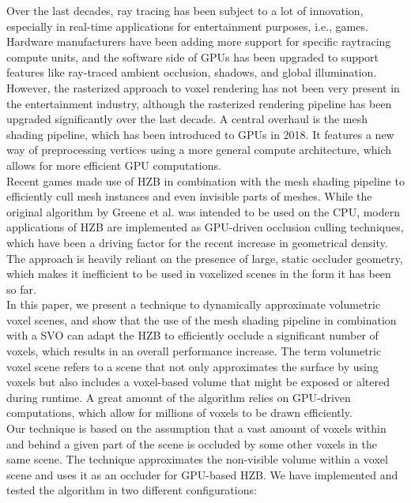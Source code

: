 \documentclass[conference]{IEEEtran}
\begin{document}
\noindent
Over the last decades, ray tracing has been subject to a lot of innovation, especially in  
real-time applications for entertainment purposes, i.e., games. Hardware manufacturers have 
been adding more support for specific raytracing compute units, and the software side of 
GPUs has been upgraded to support features like ray-traced ambient occlusion, shadows, 
and global illumination. However, the rasterized approach to voxel rendering  has not been 
very present in the entertainment industry, although the rasterized rendering pipeline has 
been upgraded significantly over the last decade. A central overhaul is the mesh shading 
pipeline, which has been introduced to \ac{GPU}s in 2018. It features a new way of preprocessing 
vertices using a more general compute architecture, which allows for more efficient \ac{GPU} 
computations. \\

\noindent
Recent games made use of \ac{HZB} in combination with the mesh shading pipeline to efficiently 
cull mesh instances and even invisible parts of meshes. While the original algorithm by Greene 
et al. \cite{b1} was intended to be used on the \ac{CPU}, modern applications of \ac{HZB} are implemented 
as \ac{GPU}-driven occlusion culling techniques, which have been a driving factor for the recent increase 
in geometrical density. The approach is heavily reliant on the presence of large, static occluder 
geometry, which makes it inefficient to be used in voxelized scenes in the form it has been so far. \\

\noindent
In this paper, we present a technique to dynamically approximate volumetric voxel scenes, and show 
that the use of the mesh shading pipeline in combination with a \ac{SVO} can adapt the \ac{HZB} to 
efficiently occlude a significant number of voxels, which results in an overall performance increase.
The term volumetric voxel scene refers to a scene that not only approximates the surface by using 
voxels but also includes a voxel-based volume that might be exposed or altered during runtime. 
A great amount of the algorithm relies on \ac{GPU}-driven computations, which allow for millions of 
voxels to be drawn efficiently. \\

\noindent
Our technique is based on the assumption that a vast amount of voxels within and behind a given 
part of the scene is occluded by some other voxels in the same scene. The technique approximates 
the non-visible volume within a voxel scene and uses it as an occluder for \ac{GPU}-based \ac{HZB}. 
We have implemented and tested the algorithm in two different configurations:
\end{document}

